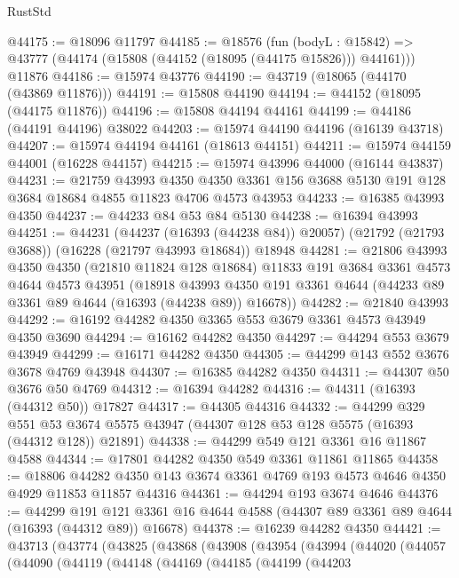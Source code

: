 \begin{lexlean}{RustStd}
\begin{coremodule}
@44175 := @18096 @11797
@44185 := @18576
    (fun (bodyL : @15842) => @43777 (@44174 (@15808 (@44152 (@18095 (@44175 @15826))) @44161)))
    @11876
@44186 := @15974 @43776
@44190 := @43719 (@18065 (@44170 (@43869 @11876)))
@44191 := @15808 @44190
@44194 := @44152 (@18095 (@44175 @11876))
@44196 := @15808 @44194 @44161
@44199 := @44186 (@44191 @44196) @38022
@44203 := @15974 @44190 @44196 (@16139 @43718)
@44207 := @15974 @44194 @44161 (@18613 @44151)
@44211 := @15974 @44159 @44001 (@16228 @44157)
@44215 := @15974 @43996 @44000 (@16144 @43837)
@44231 := @21759
    @43993
    @4350
    @4350
    @3361
    @156
    @3688
    @5130
    @191
    @128
    @3684
    @18684
    @4855
    @11823
    @4706
    @4573
    @43953
@44233 := @16385 @43993 @4350
@44237 := @44233 @84 @53 @84 @5130
@44238 := @16394 @43993
@44251 := @44231
    (@44237 (@16393 (@44238 @84)) @20057)
    (@21792 (@21793 @3688))
    (@16228 (@21797 @43993 @18684))
    @18948
@44281 := @21806
    @43993
    @4350
    @4350
    (@21810 @11824 @128 @18684)
    @11833
    @191
    @3684
    @3361
    @4573
    @4644
    @4573
    @43951
    (@18918 @43993 @4350 @191 @3361 @4644 (@44233 @89 @3361 @89 @4644 (@16393 (@44238 @89)) @16678))
@44282 := @21840 @43993
@44292 := @16192 @44282 @4350 @3365 @553 @3679 @3361 @4573 @43949 @4350 @3690
@44294 := @16162 @44282 @4350
@44297 := @44294 @553 @3679 @43949
@44299 := @16171 @44282 @4350
@44305 := @44299 @143 @552 @3676 @3678 @4769 @43948
@44307 := @16385 @44282 @4350
@44311 := @44307 @50 @3676 @50 @4769
@44312 := @16394 @44282
@44316 := @44311 (@16393 (@44312 @50)) @17827
@44317 := @44305 @44316
@44332 := @44299
    @329
    @551
    @53
    @3674
    @5575
    @43947
    (@44307 @128 @53 @128 @5575 (@16393 (@44312 @128)) @21891)
@44338 := @44299 @549 @121 @3361 @16 @11867 @4588
@44344 := @17801 @44282 @4350 @549 @3361 @11861 @11865
@44358 := @18806
    @44282
    @4350
    @143
    @3674
    @3361
    @4769
    @193
    @4573
    @4646
    @4350
    @4929
    @11853
    @11857
    @44316
@44361 := @44294 @193 @3674 @4646
@44376 := @44299
    @191
    @121
    @3361
    @16
    @4644
    @4588
    (@44307 @89 @3361 @89 @4644 (@16393 (@44312 @89)) @16678)
@44378 := @16239 @44282 @4350
@44421 := @43713
    (@43774
      (@43825
        (@43868
          (@43908
            (@43954
              (@43994
                (@44020
                  (@44057
                    (@44090
                      (@44119
                        (@44148
                          (@44169
                            (@44185
                              (@44199
                                (@44203

\end{coremodule}
\end{lexlean}
